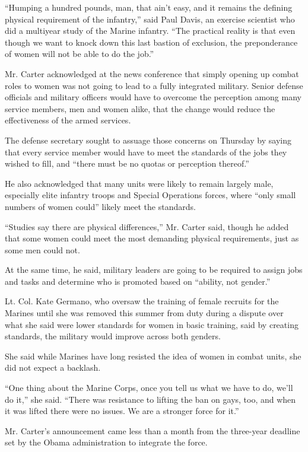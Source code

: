 ``Humping a hundred pounds, man, that ain't easy, and it remains the
defining physical requirement of the infantry,'' said Paul Davis, an
exercise scientist who did a multiyear study of the Marine infantry.
``The practical reality is that even though we want to knock down this
last bastion of exclusion, the preponderance of women will not be able
to do the job.''

Mr. Carter acknowledged at the news conference that simply opening up
combat roles to women was not going to lead to a fully integrated
military. Senior defense officials and military officers would have to
overcome the perception among many service members, men and women alike,
that the change would reduce the effectiveness of the armed services.

The defense secretary sought to assuage those concerns on Thursday by
saying that every service member would have to meet the standards of the
jobs they wished to fill, and ``there must be no quotas or perception
thereof.''

He also acknowledged that many units were likely to remain largely male,
especially elite infantry troops and Special Operations forces, where
``only small numbers of women could'' likely meet the standards.

``Studies say there are physical differences,'' Mr. Carter said, though
he added that some women could meet the most demanding physical
requirements, just as some men could not.

At the same time, he said, military leaders are going to be required to
assign jobs and tasks and determine who is promoted based on ``ability,
not gender.''

Lt. Col. Kate Germano, who oversaw the training of female recruits for
the Marines until she was removed this summer from duty during a dispute
over what she said were lower standards for women in basic training,
said by creating standards, the military would improve across both
genders.

She said while Marines have long resisted the idea of women in combat
units, she did not expect a backlash.

``One thing about the Marine Corps, once you tell us what we have to do,
we'll do it,'' she said. ``There was resistance to lifting the ban on
gays, too, and when it was lifted there were no issues. We are a
stronger force for it.''

Mr. Carter's announcement came less than a month from the three-year
deadline set by the Obama administration to integrate the force.

